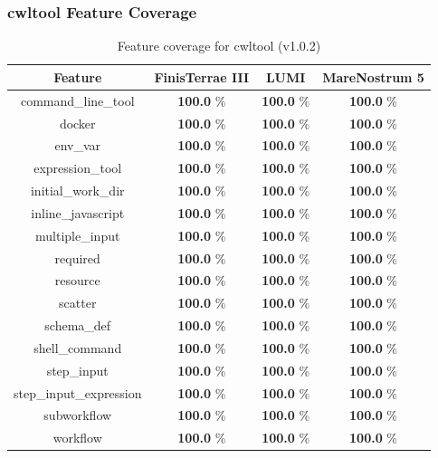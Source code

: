 \documentclass{article}
\begin{document}
\clearpage
\subsubsection*{cwltool Feature Coverage}
\begin{table}[ht!]
\centering
\setlength{\tabcolsep}{6pt}
\renewcommand{\arraystretch}{1.2}
\begin{tabular}{|c|c|c|c|}
\hline
\rowcolor{lightgray!50}
\textbf{Feature} & \textbf{FinisTerrae III} & \textbf{LUMI} & \textbf{MareNostrum 5} \\
\hline
command\_line\_tool & \textbf{100.0} \% & \textbf{100.0} \% & \textbf{100.0} \% \\
docker & \textbf{100.0} \% & \textbf{100.0} \% & \textbf{100.0} \% \\
env\_var & \textbf{100.0} \% & \textbf{100.0} \% & \textbf{100.0} \% \\
expression\_tool & \textbf{100.0} \% & \textbf{100.0} \% & \textbf{100.0} \% \\
initial\_work\_dir & \textbf{100.0} \% & \textbf{100.0} \% & \textbf{100.0} \% \\
inline\_javascript & \textbf{100.0} \% & \textbf{100.0} \% & \textbf{100.0} \% \\
multiple\_input & \textbf{100.0} \% & \textbf{100.0} \% & \textbf{100.0} \% \\
required & \textbf{100.0} \% & \textbf{100.0} \% & \textbf{100.0} \% \\
resource & \textbf{100.0} \% & \textbf{100.0} \% & \textbf{100.0} \% \\
scatter & \textbf{100.0} \% & \textbf{100.0} \% & \textbf{100.0} \% \\
schema\_def & \textbf{100.0} \% & \textbf{100.0} \% & \textbf{100.0} \% \\
shell\_command & \textbf{100.0} \% & \textbf{100.0} \% & \textbf{100.0} \% \\
step\_input & \textbf{100.0} \% & \textbf{100.0} \% & \textbf{100.0} \% \\
step\_input\_expression & \textbf{100.0} \% & \textbf{100.0} \% & \textbf{100.0} \% \\
subworkflow & \textbf{100.0} \% & \textbf{100.0} \% & \textbf{100.0} \% \\
workflow & \textbf{100.0} \% & \textbf{100.0} \% & \textbf{100.0} \% \\
\hline
\end{tabular}
\caption{Feature coverage for cwltool (v1.0.2)}
\label{tab:cwltool_feat_v10}
\end{table}
\end{document}
